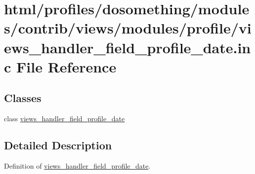 \hypertarget{views__handler__field__profile__date_8inc}{
\section{html/profiles/dosomething/modules/contrib/views/modules/profile/views\_\-handler\_\-field\_\-profile\_\-date.inc File Reference}
\label{views__handler__field__profile__date_8inc}
}
\subsection*{Classes}
\begin{DoxyCompactItemize}
\item 
class \hyperlink{classviews__handler__field__profile__date}{views\_\-handler\_\-field\_\-profile\_\-date}
\end{DoxyCompactItemize}


\subsection{Detailed Description}
Definition of \hyperlink{classviews__handler__field__profile__date}{views\_\-handler\_\-field\_\-profile\_\-date}. 